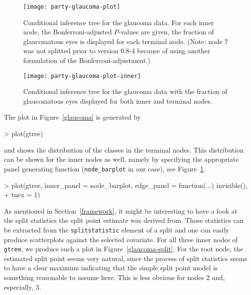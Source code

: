\documentclass{Z}
\begin{document}
\begin{figure}[p]
\begin{center}
\texttt{[image: party-glaucoma-plot]}
\caption{Conditional inference tree for the glaucoma data. For each inner node, the
Bonferroni-adjusted $P$-values are given, the fraction of glaucomatous eyes
is displayed for each terminal node. (Note: node 7 was not splitted prior to
version 0.8-4 because of using another formulation of the
Bonferroni-adjustment.) \label{glaucoma}}

\texttt{[image: party-glaucoma-plot-inner]}
\caption{Conditional inference tree for the glaucoma data with the 
         fraction of glaucomatous eyes displayed for both inner and terminal
         nodes. \label{glaucoma-inner}}
\end{center}
\end{figure}

The plot in Figure~\ref{glaucoma} is generated by

\begin{Schunk}
\begin{Sinput}
> plot(gtree)
\end{Sinput}
\end{Schunk}

and shows the distribution of the classes in 
the terminal nodes. This distribution can be shown for the inner nodes as
well, namely by specifying the appropriate panel generating function
(\texttt{node\_barplot} in our case), see Figure~\ref{glaucoma-inner}.

\begin{Schunk}
\begin{Sinput}
> plot(gtree, inner_panel = node_barplot, edge_panel = function(...) invisible(), 
+     tnex = 1)
\end{Sinput}
\end{Schunk}

As mentioned in Section~\ref{framework}, it might be interesting to have a
look at the split statistics the split point estimate was derived from.
Those statistics can be extracted from the \texttt{splitstatistic} element
of a split and one can easily produce scatterplots against the selected
covariate. For all three inner nodes of \texttt{gtree}, we produce such a
plot in Figure~\ref{glaucoma-split}. For the root node, the estimated split point
seems very natural, since the process of split statistics seems to have a
clear maximum indicating that the simple split point model is something
reasonable to assume here. This is less obvious for nodes $2$ and,
especially, $3$.
\end{document}
